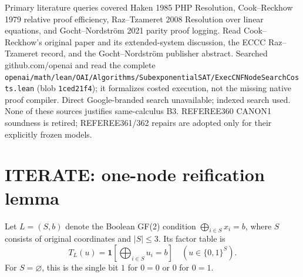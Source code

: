 \documentclass[11pt]{article}
\begin{document}
Primary literature queries covered Haken 1985 PHP Resolution, Cook--Reckhow 1979 relative proof efficiency, Raz--Tzameret 2008 Resolution over linear equations, and Gocht--Nordstr\"om 2021 parity proof logging. Read Cook--Reckhow's original paper and its extended-system discussion, the ECCC Raz--Tzameret record, and the Gocht--Nordstr\"om publisher abstract. Searched github.com/openai and read the complete \texttt{openai/math/lean/OAI/Algorithms/SubexponentialSAT/ExecCNFNodeSearchCosts.lean} (blob \texttt{1ced21f4}); it formalizes costed execution, not the missing native proof compiler. Direct Google-branded search unavailable; indexed search used. None of these sources justifies same-calculus B3. REFEREE360 CANON1 soundness is retired; REFEREE361/362 repairs are adopted only for their explicitly frozen models.

\section*{ITERATE: one-node reification lemma}
Let $L=(S,b)$ denote the Boolean GF(2) condition $\bigoplus_{i\in S}x_i=b$, where $S$ consists of original coordinates and $|S|\le3$. Its factor table is
\[
T_L(u)=\mathbf 1\left[\bigoplus_{i\in S}u_i=b\right]\quad(u\in\{0,1\}^{S}).
\]
For $S=\varnothing$, this is the single bit $1$ for $0=0$ or $0$ for $0=1$.
\end{document}
